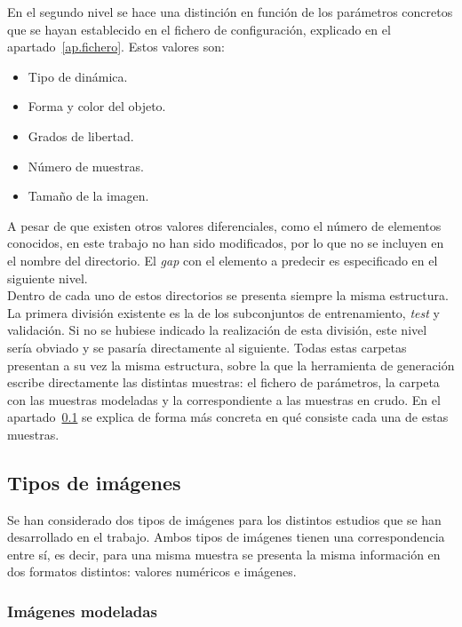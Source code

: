 En el segundo nivel se hace una distinción en función de los parámetros concretos que se hayan establecido en el fichero de configuración, explicado en el apartado~\ref{ap.fichero}. Estos valores son:

\begin{itemize}
    \setlength\itemsep{3pt}
    \item Tipo de dinámica.
    \item Forma y color del objeto.
    \item Grados de libertad.
    \item Número de muestras.
    \item Tamaño de la imagen.
\end{itemize}

A pesar de que existen otros valores diferenciales, como el número de elementos conocidos, en este trabajo no han sido modificados, por lo que no se incluyen en el nombre del directorio. El \textit{gap} con el elemento a predecir es especificado en el siguiente nivel.\\

Dentro de cada uno de estos directorios se presenta siempre la misma estructura. La primera división existente es la de los subconjuntos de entrenamiento, \textit{test} y validación. Si no se hubiese indicado la realización de esta división, este nivel sería obviado y se pasaría directamente al siguiente. Todas estas carpetas presentan a su vez la misma estructura, sobre la que la herramienta de generación escribe directamente las distintas muestras: el fichero de parámetros, la carpeta con las muestras modeladas y la correspondiente a las muestras en crudo. En el apartado~\ref{ap.tip_img} se explica de forma más concreta en qué consiste cada una de estas muestras.

\subsection{Tipos de imágenes} \label{ap.tip_img}

Se han considerado dos tipos de imágenes para los distintos estudios que se han desarrollado en el trabajo. Ambos tipos de imágenes tienen una correspondencia entre sí, es decir, para una misma muestra se presenta la misma información en dos formatos distintos: valores numéricos e imágenes.

\subsubsection{Imágenes modeladas}

